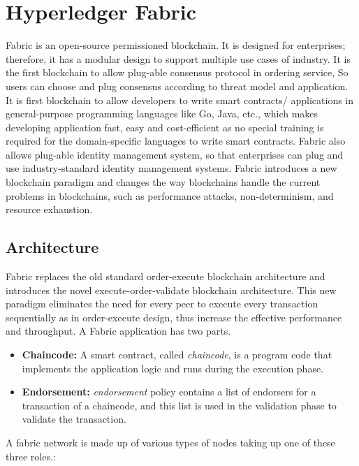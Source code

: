 \chapter{Hyperledger Fabric}
\label{ch:fabric}
Fabric\cite{androulaki2018hyperledger} is an open-source permissioned blockchain. It is designed for enterprises; therefore, it has a modular design to support multiple use cases of industry. It is the first blockchain to allow plug-able consensus protocol in ordering service, So users can choose and plug consensus according to threat model and application. It is first blockchain to allow developers to write smart contracts/ applications in general-purpose programming languages like Go, Java, etc., which makes developing application fast, easy and cost-efficient as no special training is required for the domain-specific languages to write smart contracts. Fabric also allows plug-able identity management system, so that enterprises can plug and use industry-standard identity management systems. Fabric introduces a new blockchain paradigm and changes the way blockchains handle the current problems in blockchains, such as performance attacks, non-determinism, and resource exhaustion. 
 
\section{Architecture}
Fabric replaces the old standard order-execute blockchain architecture and introduces the novel execute-order-validate blockchain architecture. This new paradigm eliminates the need for every peer to execute every transaction sequentially as in order-execute design, thus increase the effective performance and throughput. A Fabric application has two parts.
\begin{itemize}
    \item \textbf{Chaincode:} A smart contract, called \textit{chaincode}, is a program code that implements the application logic and runs during the execution phase.
    \item \textbf{Endorsement:} \textit{endorsement} policy contains a list of endorsers for a transaction of a chaincode, and this list is used in the validation phase to validate the transaction. 
    
\end{itemize}
\clearpage

A fabric network is made up of various types of nodes taking up one of these three roles.:


